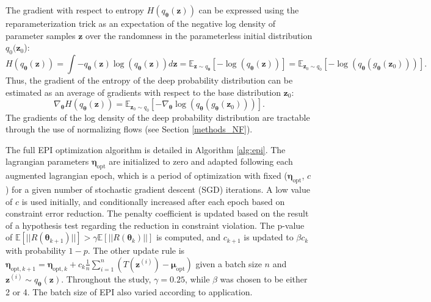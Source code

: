 \documentclass[11pt]{article}
\begin{document}
The gradient with respect to entropy $H(q_{\bm{\theta}}(\mathbf{z}))$ can be expressed using the reparameterization trick as an expectation of the negative log density of parameter samples $\mathbf{z}$ over the randomness in the parameterless initial distribution $q_0(\mathbf{z}_0$):
\begin{equation}
H(q_{\bm{\theta}}(\mathbf{z})) = \int - q_{\bm{\theta}}(\mathbf{z}) \log(q_{\bm{\theta}}(\mathbf{z})) d\mathbf{z} = \mathbb{E}_{\mathbf{z} \sim q_{\bm{\theta}}}\left[-\log(q_{\bm{\theta}}(\mathbf{z})) \right] = \mathbb{E}_{\mathbf{z}_0 \sim q_0}\left[-\log(q_{\bm{\theta}}(g_{\bm{\theta}}(\mathbf{z}_0))) \right].
\end{equation}
Thus, the gradient of the entropy of the deep probability distribution can be estimated as an average of gradients with respect to the base distribution $\mathbf{z}_0$:
\begin{equation}
\nabla_{\bm{\theta}} H(q_{\bm{\theta}}(\mathbf{z})) = \mathbb{E}_{\mathbf{z}_0 \sim q_0}\left[- \nabla_{\bm{\theta}} \log(q_{\bm{\theta}}(g_{\bm{\theta}}(\mathbf{z}_0))) \right].
\end{equation}
The gradients of the log density of the deep probability distribution are tractable through the use of normalizing flows (see Section \ref{methods_NF}).

The full EPI optimization algorithm is detailed in Algorithm \ref{alg:epi}. The lagrangian parameters $\bm{\eta}_{\text{opt}}$ are initialized to zero and adapted following each augmented lagrangian epoch, which is a period of optimization with fixed ($\bm{\eta}_{\text{opt}}$, $c$) for a given number of stochastic gradient descent (SGD) iterations. 
A low value of $c$ is used initially, and conditionally increased after each epoch based on constraint error reduction.
The penalty coefficient is updated based on the result of a hypothesis test regarding the reduction in constraint violation.  
The p-value of $\mathbb{E}[||R(\bm{\theta}_{k+1})||] > \gamma \mathbb{E} \left[||R(\bm{\theta}_{k})|| \right]$ is computed, and $c_{k+1}$ is updated  to $\beta c_k$ with probability $1-p$.  
The other update rule is $\bm{\eta}_{\text{opt},k+1} = \bm{\eta}_{\text{opt},k} + c_k \frac{1}{n} \sum_{i=1}^n (T(\mathbf{z}^{(i)}) - \bm{\mu}_{\text{opt}})$ given a batch size $n$ and $\mathbf{z}^{(i)} \sim q_{\bm{\theta}}(\mathbf{z})$.
Throughout the study, $\gamma = 0.25$, while $\beta$ was chosen to be either 2 or 4.  The batch size of EPI also varied according to application.
\end{document}
